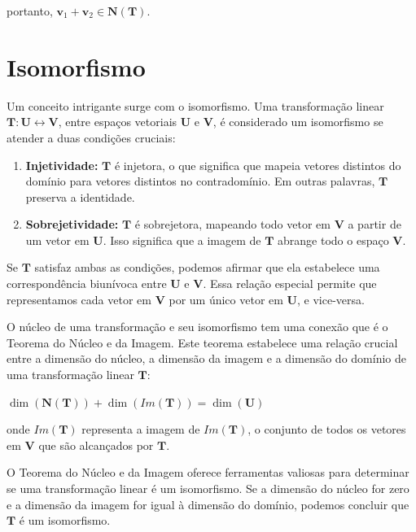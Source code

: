 \noindent portanto, $\mathbf{v}_1 + \mathbf{v}_2 \in \mathbf{N}(\mathbf{T})$. 

\section{Isomorfismo}
Um conceito intrigante surge com o isomorfismo. Uma transformação linear $\mathbf{T}: \mathbf{U} \longleftrightarrow \mathbf{V}$, entre espaços vetoriais $\mathbf{U}$ e $\mathbf{V}$, é considerado um isomorfismo se atender a duas condições cruciais:

\begin{enumerate}
	\item \textbf{Injetividade:} $\mathbf{T}$ é injetora, o que significa que mapeia vetores distintos do domínio para vetores distintos no contradomínio. Em outras palavras, $\mathbf{T}$ preserva a identidade.
	\item \textbf{Sobrejetividade:} $\mathbf{T}$ é sobrejetora, mapeando todo vetor em $\mathbf{V}$ a partir de um vetor em $\mathbf{U}$. Isso significa que a imagem de $\mathbf{T}$ abrange todo o espaço $\mathbf{V}$.
\end{enumerate}

Se $\mathbf{T}$ satisfaz ambas as condições, podemos afirmar que ela estabelece uma correspondência biunívoca entre $\mathbf{U}$ e $\mathbf{V}$. Essa relação especial permite que representamos cada vetor em $\mathbf{V}$  por um único vetor em $\mathbf{U}$, e vice-versa.

O núcleo de uma transformação e seu isomorfismo tem uma conexão que é o Teorema do Núcleo e da Imagem. Este teorema estabelece uma relação crucial entre a dimensão do núcleo, a dimensão da imagem e a dimensão do domínio de uma transformação linear $\mathbf{T}$:

\centerline{$\dim(\mathbf{N}(\mathbf{T})) + \dim(Im(\mathbf{T})) = \dim(\mathbf{U})$}

\noindent onde $Im(\mathbf{T})$ representa a imagem de $Im(\mathbf{T})$, o conjunto de todos os vetores em $\mathbf{V}$ que são alcançados por $\mathbf{T}$.

O Teorema do Núcleo e da Imagem oferece ferramentas valiosas para determinar se uma transformação linear é um isomorfismo. Se a dimensão do núcleo for zero e a dimensão da imagem for igual à dimensão do domínio, podemos concluir que $\mathbf{T}$ é um isomorfismo.

